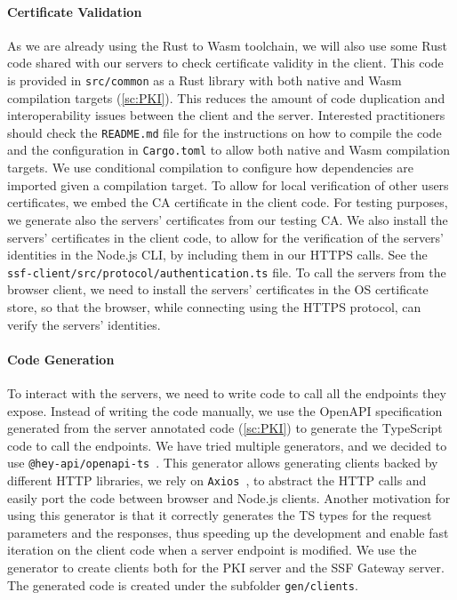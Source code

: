 \paragraph{Certificate Validation}
As we are already using the Rust to Wasm toolchain, 
we will also use some Rust code shared
with our servers to check certificate validity in the client.
This code is provided in \texttt{src/common} as a Rust library
with both native and Wasm compilation targets (\cref{sc:PKI}).
This reduces the amount of code duplication and interoperability
issues between the client and the server. Interested practitioners
should check the \texttt{README.md} file for the
instructions on how to compile the code and the configuration
in \texttt{Cargo.toml} to allow both native and Wasm compilation
targets. We use conditional
compilation to configure how dependencies are imported
given a compilation target. To allow for local verification
of other users certificates,
we embed the CA certificate in the client code.
For testing purposes, we generate also the servers' certificates
from our testing CA.
We also install the servers' certificates in the client code,
to allow for the verification of the servers' identities
in the Node.js CLI, by including them in our HTTPS calls.
See the \texttt{ssf-client/src/protocol/authentication.ts} file.
To call the servers from the browser client,
we need to install the servers' certificates in the OS
certificate store, so that the browser, while connecting 
using the HTTPS protocol, can verify the servers' identities.

\paragraph{Code Generation}
To interact with the servers, we need to write code to
call all the endpoints they expose.
Instead of writing the code manually, we use the OpenAPI
specification generated from the server annotated code (\cref{sc:PKI})
to generate the TypeScript code to call the endpoints.
We have tried multiple generators, and we
decided to use \texttt{@hey-api/openapi-ts}~\cite{OpenAPITs}.
This generator allows generating clients backed by
different HTTP libraries, we rely on \texttt{Axios}~\cite{OpenAPIAxios}, 
to abstract the HTTP calls and easily port the code
between browser and Node.js clients.
Another motivation for using this generator is that it
correctly generates the TS types for the request parameters
and the responses, thus speeding up the development
and enable fast iteration on the client code when a server
endpoint is modified.
We use the generator to create clients both for the PKI server and the SSF Gateway server.
The generated code is created under the subfolder \texttt{gen/clients}.


